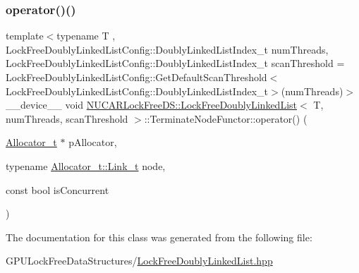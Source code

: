 \subsubsection{\texorpdfstring{operator()()}{operator()()}}
{\footnotesize\ttfamily template$<$typename T , Lock\+Free\+Doubly\+Linked\+List\+Config\+::\+Doubly\+Linked\+List\+Index\+\_\+t num\+Threads, Lock\+Free\+Doubly\+Linked\+List\+Config\+::\+Doubly\+Linked\+List\+Index\+\_\+t scan\+Threshold = Lock\+Free\+Doubly\+Linked\+List\+Config\+::\+Get\+Default\+Scan\+Threshold$<$\+Lock\+Free\+Doubly\+Linked\+List\+Config\+::\+Doubly\+Linked\+List\+Index\+\_\+t$>$(num\+Threads)$>$ \\
\+\_\+\+\_\+device\+\_\+\+\_\+ void \mbox{\hyperlink{class_n_u_c_a_r_lock_free_d_s_1_1_lock_free_doubly_linked_list}{N\+U\+C\+A\+R\+Lock\+Free\+D\+S\+::\+Lock\+Free\+Doubly\+Linked\+List}}$<$ T, num\+Threads, scan\+Threshold $>$\+::Terminate\+Node\+Functor\+::operator() (\begin{DoxyParamCaption}\item[{\mbox{\hyperlink{class_n_u_c_a_r_lock_free_d_s_1_1_lock_free_doubly_linked_list_af534991f4eb0641191f936a80c701e6c}{Allocator\+\_\+t}} $\ast$}]{p\+Allocator,  }\item[{typename \mbox{\hyperlink{class_n_u_c_a_r_lock_free_d_s_1_1_allocator_a5508d82b795e6c1977bebb67b5e5b686}{Allocator\+\_\+t\+::\+Link\+\_\+t}}}]{node,  }\item[{const bool}]{is\+Concurrent }\end{DoxyParamCaption})\hspace{0.3cm}{\ttfamily [inline]}}



The documentation for this class was generated from the following file\+:\begin{DoxyCompactItemize}
\item 
G\+P\+U\+Lock\+Free\+Data\+Structures/\mbox{\hyperlink{_lock_free_doubly_linked_list_8hpp}{Lock\+Free\+Doubly\+Linked\+List.\+hpp}}\end{DoxyCompactItemize}
